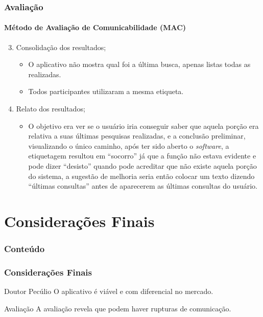 \documentclass[14pt,beamer]{beamer}
\begin{document}
\begin{frame}
	\frametitle{Avaliação}
	\framesubtitle{Método de Avaliação de Comunicabilidade (MAC)}

	\begin{enumerate} \setcounter{enumi}{2}
        \item Consolidação dos resultados;
            \begin{itemize}
                \item O aplicativo não mostra qual foi a última busca,
                apenas listas todas as realizadas.
                \item Todos participantes utilizaram a mesma etiqueta.
            \end{itemize}
        \item Relato dos resultados;
            \begin{itemize}
                \item O objetivo era ver se o usuário iria conseguir saber que aquela porção era relativa a suas 
        últimas pesquisas realizadas, e a conclusão preliminar, visualizando o único caminho, após ter 
        sido aberto o \emph{software}, a etiquetagem resultou em ``socorro'' já que a função não estava 
        evidente e pode dizer ``desisto'' quando pode acreditar que não existe aquela porção do 
        sistema, a sugestão de melhoria seria então colocar um texto dizendo ``últimas consultas''
        antes de aparecerem as últimas consultas do usuário.
            \end{itemize}
        \end{enumerate}
\end{frame}
\section{Considerações Finais}

\begin{frame}
	\frametitle{Conteúdo}
    \begin{multicols}{2}
        \small
    \end{multicols}
\end{frame}
\begin{frame}
	\frametitle{Considerações Finais}

	\begin{block}{Doutor Pecúlio}
	O aplicativo é viável e com diferencial no mercado.
	\end{block}
    
    \begin{block}{Avaliação}
	A avaliação revela que podem haver rupturas de comunicação.
	\end{block}
\end{frame}
\end{document}
